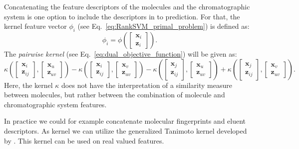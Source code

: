 \documentclass[10p]{article}
\newcommand{\x}{\mathbf{x}}
\newcommand{\z}{\mathbf{z}}
\newcommand{\molkern}{\kappa}
\begin{document}
Concatenating the feature descriptors of the molecules and the chromatographic system is one option to include the descriptors in to prediction. For that, the kernel feature vector $\phi_i$ (see Eq.~\eqref{eq:RankSVM_primal_problem}) is defined as:
\begin{equation}
    \phi_i = \phi\left(\left[\begin{matrix}\x_i\\\z_i\end{matrix}\right]\right).
\end{equation}
The \emph{pairwise kernel} (see Eq.~\eqref{eq:dual_objective_function}) will be given as:
\begin{equation}
     \molkern\left(\left[\begin{matrix}\x_i\\\z_{ij}\end{matrix}\right],\left[\begin{matrix}\x_u\\\z_{uv}\end{matrix}\right]\right)
    -\molkern\left(\left[\begin{matrix}\x_i\\\z_{ij}\end{matrix}\right],\left[\begin{matrix}\x_v\\\z_{uv}\end{matrix}\right]\right)
    -\molkern\left(\left[\begin{matrix}\x_j\\\z_{ij}\end{matrix}\right],\left[\begin{matrix}\x_u\\\z_{uv}\end{matrix}\right]\right)
    +\molkern\left(\left[\begin{matrix}\x_j\\\z_{ij}\end{matrix}\right],\left[\begin{matrix}\x_v\\\z_{uv}\end{matrix}\right]\right).
\end{equation}
Here, the kernel $\molkern$ does not have the interpretation of a similarity measure between molecules, but rather between the combination of molecule and chromatographic system features. 
\begin{mdframed}[style=openquestion]
     In practice we could for example concatenate molecular fingerprints and eluent descriptors. As kernel we can utilize the generalized Tanimoto kernel developed by \textcite{Szedmak2020a}. This kernel can be used on real valued features.
\end{mdframed}
\end{document}
